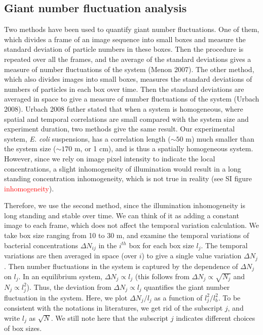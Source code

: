 \documentclass[twocolumn,aps,pre,amsmath,amssymb,floatfix,longbibliography]{revtex4-1}
\begin{document}
\subsection{Giant number fluctuation analysis}\label{sec:method_gnf}
Two methods have been used to quantify giant number fluctuations. One of them, which divides a frame of an image sequence into small boxes and measure the standard deviation of particle numbers in these boxes. Then the procedure is repeated over all the frames, and the average of the standard deviations gives a measure of number fluctuations of the system (Menon 2007). The other method, which also divides images into small boxes, measures the standard deviations of numbers of particles in each box over time. Then the standard deviations are averaged in space to give a measure of number fluctuations of the system (Urbach 2008). Urbach 2008 futher stated that when a system is homogeneous, where spatial and temporal correlations are small compared with the system size and experiment duration, two methods give the same result. Our experimental system, \textit{E. coli} suspensions, has a correlation length ($\sim 50$ \textmu m) much smaller than the system size ($\sim 170$ \textmu m, or 1 cm), and is thus a spatially homogeneous system. However, since we rely on image pixel intensity to indicate the local concentrations, a slight inhomogeneity of illumination would result in a long standing concentration inhomogeneity, which is not true in reality (see SI figure \textcolor{red}{inhomogeneity}).

Therefore, we use the second method, since the illumination inhomogeneity is long standing and stable over time. We can think of it as adding a constant image to each frame, which does not affect the temporal variation calculation. We take box size ranging from 10 to 30 \textmu m, and examine the temporal variations of bacterial concentrations $\Delta N_{ij}$ in the $i^{th}$ box for each box size $l_j$. The temporal variations are then averaged in space (over $i$) to give a single value variation $\Delta N_{j}$. Then number fluctuations in the system is captured by the dependence of $\Delta N_{j}$ on $l_j$. In an equilibrium system, $\Delta N_{j}\propto l_j$ (this follows from $\Delta N_{j}\propto \sqrt{N_j}$ and $N_j\propto l_j^2$). Thus, the deviation from $\Delta N_{j}\propto l_j$ quantifies the giant number fluctuation in the system. Here, we plot $\Delta N_{j}/l_j$ as a function of $l_j^2/l_b^2$. To be consistent with the notations in literatures, we get rid of the subscript $j$, and write $l_j$ as $\sqrt{N}$. We still note here that the subscript $j$ indicates different choices of box sizes.
\end{document}

